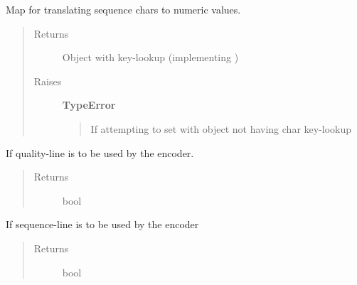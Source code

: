 \documentclass[letterpaper,10pt,english]{sphinxmanual}
\begin{document}
\begin{fulllineitems}
\begin{fulllineitems}
\label{fseq.reading:fseq.reading.seq_encoder.SeqEncoder.sequenceEncoding}
Map for translating sequence chars to numeric values.
\begin{quote}\begin{description}
\item[{Returns}] \leavevmode
Object with key-lookup (implementing )

\item[{Raises}] \leavevmode
\textbf{TypeError}
\begin{quote}

If attempting to set with object not having char key-lookup
\end{quote}

\end{description}\end{quote}

\end{fulllineitems}


\begin{fulllineitems}
\label{fseq.reading:fseq.reading.seq_encoder.SeqEncoder.useQuality}
If quality-line is to be used by the encoder.
\begin{quote}\begin{description}
\item[{Returns}] \leavevmode
bool

\end{description}\end{quote}

\end{fulllineitems}


\begin{fulllineitems}
\label{fseq.reading:fseq.reading.seq_encoder.SeqEncoder.useSequence}
If sequence-line is to be used by the encoder
\begin{quote}\begin{description}
\item[{Returns}] \leavevmode
bool

\end{description}\end{quote}

\end{fulllineitems}


\end{fulllineitems}
\end{document}
